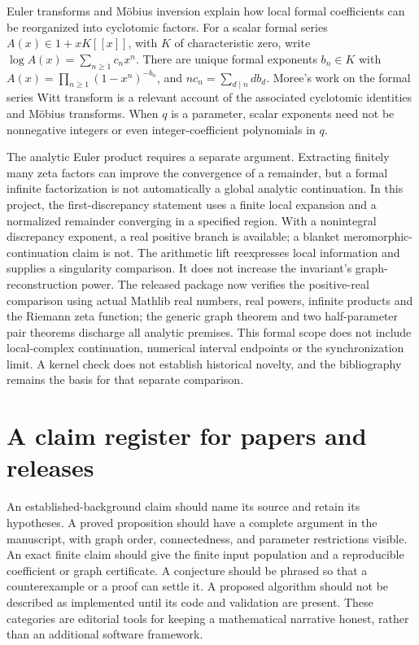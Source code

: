 \documentclass[
  11pt,
  a4paper,
]{report}
\let\singularitytexttt\texttt
\renewcommand{\texttt}[1]{\singularitytexttt{\seqsplit{#1}}}
\begin{document}
Euler transforms and Möbius inversion explain how local formal
coefficients can be reorganized into cyclotomic factors. For a scalar
formal series \(A(x)\in1+xK[[x]]\), with \(K\) of characteristic zero,
write \(\log A(x)=\sum_{n\ge1}c_nx^n\). There are unique formal
exponents \(b_n\in K\) with \(A(x)=\prod_{n\ge1}(1-x^n)^{-b_n}\), and
\(n c_n=\sum_{d\mid n}d b_d\). Moree's work on the formal series Witt
transform is a relevant account of the associated cyclotomic identities
and Möbius transforms. When \(q\) is a parameter, scalar exponents need
not be nonnegative integers or even integer-coefficient polynomials in
\(q\).

The analytic Euler product requires a separate argument. Extracting
finitely many zeta factors can improve the convergence of a remainder,
but a formal infinite factorization is not automatically a global
analytic continuation. In this project, the first-discrepancy statement
uses a finite local expansion and a normalized remainder converging in a
specified region. With a nonintegral discrepancy exponent, a real
positive branch is available; a blanket meromorphic-continuation claim
is not. The arithmetic lift reexpresses local information and supplies a
singularity comparison. It does not increase the invariant's
graph-reconstruction power. The released \texttt{formal-analysis/}
package now verifies the positive-real comparison using actual Mathlib
real numbers, real powers, infinite products and the Riemann zeta
function; the generic graph theorem and two half-parameter pair theorems
discharge all analytic premises. This formal scope does not include
local-complex continuation, numerical interval endpoints or the
synchronization limit. A kernel check does not establish historical
novelty, and the bibliography remains the basis for that separate
comparison.

\hypertarget{a-claim-register-for-papers-and-releases}{%
\section{A claim register for papers and
releases}\label{a-claim-register-for-papers-and-releases}}

An established-background claim should name its source and retain its
hypotheses. A proved proposition should have a complete argument in the
manuscript, with graph order, connectedness, and parameter restrictions
visible. An exact finite claim should give the finite input population
and a reproducible coefficient or graph certificate. A conjecture should
be phrased so that a counterexample or a proof can settle it. A proposed
algorithm should not be described as implemented until its code and
validation are present. These categories are editorial tools for keeping
a mathematical narrative honest, rather than an additional software
framework.
\end{document}
